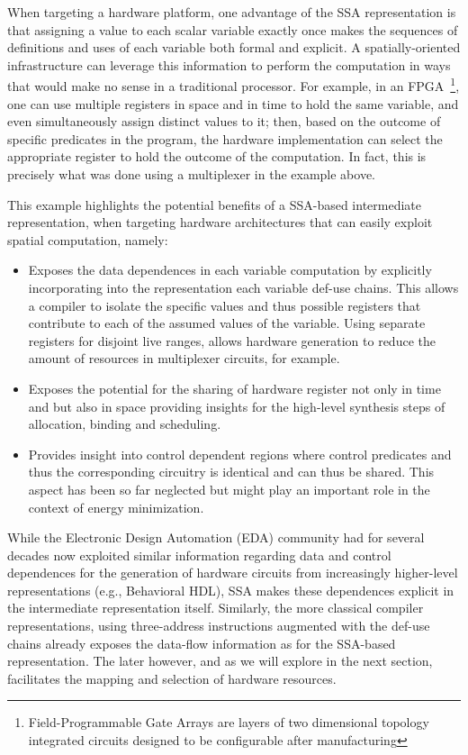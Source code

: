 When targeting a hardware platform, one advantage of the SSA representation is that assigning a value to each scalar variable exactly once makes the sequences of definitions and uses of each variable both formal and explicit. 
A spatially-oriented infrastructure can leverage this information to perform the computation in ways that would make no sense in a traditional processor. 
For example, in an FPGA~\footnote{Field-Programmable Gate Arrays are layers of two dimensional topology integrated circuits designed to be configurable after manufacturing}, one can use multiple registers in space and in time to hold the same variable, and even simultaneously assign distinct values to it; 
then, based on the outcome of specific predicates in the program, the hardware implementation can select the appropriate register to hold the outcome of the computation. 
In fact, this is precisely what was done using a multiplexer in the example above.

This example highlights the potential benefits of a SSA-based intermediate representation, when
targeting hardware architectures that can easily exploit spatial
computation, namely:
\begin{itemize}
\item Exposes the data dependences in each variable computation by explicitly incorporating into the representation each variable def-use chains. 
  This allows a compiler to isolate the specific values and thus possible registers that contribute to each of the assumed values of the variable. 
  Using separate registers for disjoint live ranges, allows hardware generation to reduce the amount of resources in multiplexer circuits, for example.
\item Exposes the potential for the sharing of hardware register not only in time and but also in space providing insights for the high-level synthesis steps of allocation, binding and scheduling.
\item Provides insight into control dependent regions where control predicates and thus the corresponding circuitry is identical and can thus be shared. 
  This aspect has been so far neglected but might play an important role in the context of energy minimization. 
\end{itemize}

While the Electronic Design Automation (EDA) community had for several decades now exploited similar information regarding data and control dependences for the generation of hardware circuits from increasingly higher-level representations (e.g., Behavioral HDL), SSA makes these dependences explicit in the intermediate representation itself. 
Similarly, the more classical compiler representations, using three-address instructions augmented with the def-use chains already exposes the data-flow information as for the SSA-based representation. 
The later however, and as we will explore in the next section, facilitates the mapping and selection of hardware resources.


